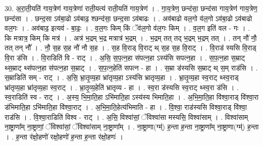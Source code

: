 \documentclass[17pt]{extarticle}
\begin{document}
30. अ॒रा॒ती॒यति॑ गाय॒त्रेण॑ गाय॒त्रेणा॑ राती॒यत्य॑ राती॒यति॑ गाय॒त्रेण॑ । . गा॒य॒त्रेण॒ छन्द॑सा॒ छन्द॑सा गाय॒त्रेण॑ गाय॒त्रेण॒ छन्द॑सा । . छन्द॒सा ऽव॑बा॒ढो ऽव॑बाढ॒ श्छन्द॑सा॒ छन्द॒सा ऽव॑बाढः । . अव॑बाढो वल॒गो व॑ल॒गो ऽव॑बा॒ढो ऽव॑बाढो वल॒गः । . अव॑बाढ॒ इत्यव॑ - बा॒ढः॒ । . व॒ल॒गः किम् किं ॅव॑ल॒गो व॑ल॒गः किम् । . व॒ल॒ग इति॑ वल - गः । . कि मत्रात्र॒ किम् कि मत्र॑ । . अत्र॑ भ॒द्रम् भ॒द्र मत्रात्र॑ भ॒द्रम् । . भ॒द्रम् तत् तद् भ॒द्रम् भ॒द्रम् तत् । . तन् नौ॑ नौ॒ तत् तन् नौ᳚ । . नौ॒ स॒ह स॒ह नौ॑ नौ स॒ह । . स॒ह वि॒राड् वि॒राट् थ् स॒ह स॒ह वि॒राट् । . वि॒राड॑ स्यसि वि॒राड् वि॒रा ड॑सि । . वि॒राडिति॑ वि - राट् । . अ॒सि॒ स॒प॒त्न॒हा स॑पत्न॒हा ऽस्य॑सि सपत्न॒हा । . स॒प॒त्न॒हा स॒म्राट् थ्स॒म्राट् थ्स॑पत्न॒हा स॑पत्न॒हा स॒म्राट् । . स॒प॒त्न॒हेति॑ सपत्न - हा । . स॒म्रा ड॑स्यसि स॒म्राट् थ् स॒म् राड॑सि । . स॒म्राडिति॑ सम् - राट् । . अ॒सि॒ भ्रा॒तृ॒व्य॒हा भ्रा॑तृव्य॒हा ऽस्य॑सि भ्रातृव्य॒हा । . भ्रा॒तृ॒व्य॒हा स्व॒राट् थ्स्व॒राड् भ्रा॑तृव्य॒हा भ्रा॑तृव्य॒हा स्व॒राट् । . भ्रा॒तृ॒व्य॒हेति॑ भ्रातृव्य - हा । . स्व॒रा ड॑स्यसि स्व॒राट् थ्स्व॒रा ड॑सि । . स्व॒राडिति॑ स्व - राट् । . अ॒स्य॒ भि॒मा॒ति॒हा ऽभि॑माति॒हा ऽस्य॑स्य भिमाति॒हा । . अ॒भि॒मा॒ति॒हा वि॑श्वा॒राड् वि॑श्वा॒रा ड॑भिमाति॒हा ऽभि॑माति॒हा वि॑श्वा॒राट् । . अ॒भि॒मा॒ति॒हेत्य॑भिमाति - हा । . वि॒श्वा॒ राड॑स्यसि विश्वा॒राड् वि॑श्वा॒ राड॑सि । . वि॒श्वा॒राडिति॑ विश्व - राट् । . अ॒सि॒ विश्वा॑सां॒ ॅविश्वा॑सा मस्यसि॒ विश्वा॑साम् । . विश्वा॑साम् ना॒ष्ट्राणा᳚म् ना॒ष्ट्राणां॒ ॅविश्वा॑सां॒ ॅविश्वा॑साम् ना॒ष्ट्राणा᳚म् । . ना॒ष्ट्राणा(ग्म्॑) ह॒न्ता ह॒न्ता ना॒ष्ट्राणा᳚म् ना॒ष्ट्राणा(ग्म्॑) ह॒न्ता । . ह॒न्ता र॑क्षो॒हणो॑ रक्षो॒हणो॑ ह॒न्ता ह॒न्ता र॑क्षो॒हणः॑ । \newline
\end{document}
